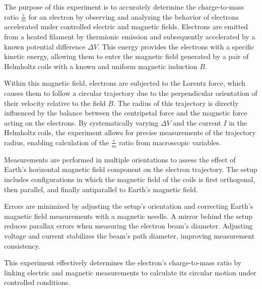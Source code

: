 
%


The purpose of this experiment is to accurately determine the charge-to-mass ratio \( \frac{e}{m} \) for an electron by observing and analyzing the behavior of electrons accelerated under controlled electric and magnetic fields. Electrons are emitted from a heated filament by thermionic emission and subsequently accelerated by a known potential difference \( \Delta V \). This energy provides the electrons with a specific kinetic energy, allowing them to enter the magnetic field generated by a pair of Helmholtz coils with a known and uniform magnetic induction \( B \). 

Within this magnetic field, electrons are subjected to the Lorentz force, which causes them to follow a circular trajectory due to the perpendicular orientation of their velocity relative to the field \( B \). The radius of this trajectory is directly influenced by the balance between the centripetal force and the magnetic force acting on the electrons. By systematically varying \( \Delta V \) and the current \( I \) in the Helmholtz coils, the experiment allows for precise measurements of the trajectory radius, enabling calculation of the \( \frac{e}{m} \) ratio from macroscopic variables.

Measurements are performed in multiple orientations to assess the effect of Earth’s horizontal magnetic field component on the electron trajectory. The setup includes configurations in which the magnetic field of the coils is first orthogonal, then parallel, and finally antiparallel to Earth’s magnetic field.

Errors are minimized by adjusting the setup's orientation and correcting Earth’s magnetic field measurements with a magnetic needle. A mirror behind the setup reduces parallax errors when measuring the electron beam's diameter. Adjusting voltage and current stabilizes the beam's path diameter, improving measurement consistency.

This experiment effectively determines the electron’s charge-to-mass ratio by linking electric and magnetic measurements to calculate its circular motion under controlled conditions.

